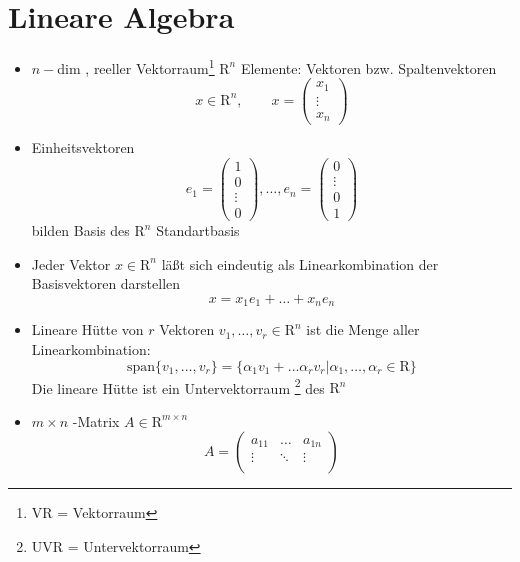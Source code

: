 \documentclass[ngerman]{tudscrreprt}
\begin{document}
\section{Lineare Algebra}
\begin{itemize}
\item $n-$dim , reeller Vektorraum\footnote{VR = Vektorraum} $\mathrm{R}^n$ Elemente: Vektoren bzw. Spaltenvektoren
\begin{equation*}
x\in \mathrm{R}^n , \qquad x = \begin{pmatrix} x_1 \\ \vdots\\ x_n \end{pmatrix} 
\end{equation*} 
\item Einheitsvektoren 
\begin{equation*}
e_1 = 
\begin{pmatrix}
1\\ 0\\ \vdots\\ 0
\end{pmatrix} , \dots, 
e_n=
\begin{pmatrix}
0\\ \vdots\\ 0\\ 1
\end{pmatrix}
\end{equation*}
bilden Basis des $\mathrm{R}^n$ Standartbasis
\item Jeder Vektor $x\in \mathrm{R}^n$ läßt sich eindeutig als Linearkombination der Basisvektoren darstellen
\begin{equation*}
x = x_1 e_1 + \dots + x_n e_n
\end{equation*}
\item Lineare Hütte von $r$ Vektoren $v_1 , \dots, v_r \in \mathrm{R}^n$ ist die Menge aller Linearkombination: 
\begin{equation*}
\text{span}\{ v_1, \dots, v_r \} = \{ \alpha_1 v_1 + \dots \alpha_r v_r | \alpha_1, \dots, \alpha_r \in \mathrm{R} \}
\end{equation*}
Die lineare Hütte ist ein Untervektorraum \footnote{UVR = Untervektorraum} des $\mathrm{R}^n$
\item $m\times n$ -Matrix $A \in \mathrm{R}^{m\times n}$
\begin{equation*}
A= 
\begin{pmatrix}
a_{11} &\dots &a_{1n}\\ 
\vdots &\ddots &\vdots\\ 

\end{pmatrix}
\end{equation*}
\end{itemize}
\end{document}
